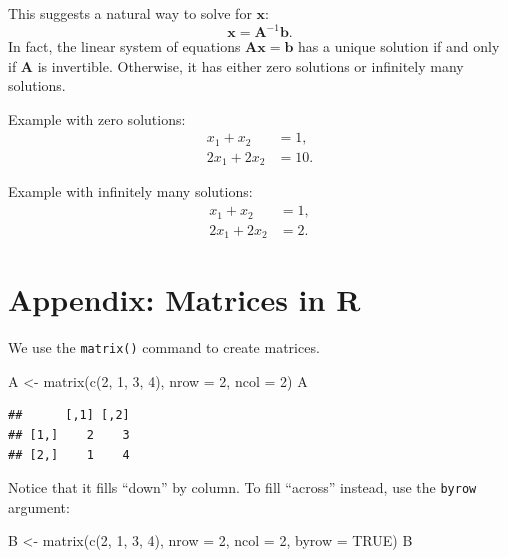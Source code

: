 \documentclass[
  12pt,
  oneside,openany]{book}
\newenvironment{Shaded}{\begin{snugshade}}{\end{snugshade}}
\newcommand{\AttributeTok}[1]{\textcolor[rgb]{0.77,0.63,0.00}{#1}}
\newcommand{\ConstantTok}[1]{\textcolor[rgb]{0.00,0.00,0.00}{#1}}
\newcommand{\DecValTok}[1]{\textcolor[rgb]{0.00,0.00,0.81}{#1}}
\newcommand{\FunctionTok}[1]{\textcolor[rgb]{0.00,0.00,0.00}{#1}}
\newcommand{\NormalTok}[1]{#1}
\newcommand{\OtherTok}[1]{\textcolor[rgb]{0.56,0.35,0.01}{#1}}
\begin{document}
This suggests a natural way to solve for \(\mathbf{x}\): \[\mathbf{x} = \mathbf{A}^{-1} \mathbf{b}.\] In fact, the linear system of equations \(\mathbf{A} \mathbf{x} = \mathbf{b}\) has a unique solution if and only if \(\mathbf{A}\) is invertible. Otherwise, it has either zero solutions or infinitely many solutions.

Example with zero solutions:
\[
\begin{aligned}
x_1 + x_2 &= 1, \\
2 x_1 + 2 x_2 &= 10.
\end{aligned}
\]

Example with infinitely many solutions:
\[
\begin{aligned}
x_1 + x_2 &= 1, \\
2 x_1 + 2 x_2 &= 2.
\end{aligned}
\]

\hypertarget{appendix-matrices-in-r}{%
\section{Appendix: Matrices in R}\label{appendix-matrices-in-r}}

We use the \texttt{matrix()} command to create matrices.

\begin{Shaded}
\begin{Highlighting}[]
\NormalTok{A }\OtherTok{\textless{}{-}} \FunctionTok{matrix}\NormalTok{(}\FunctionTok{c}\NormalTok{(}\DecValTok{2}\NormalTok{, }\DecValTok{1}\NormalTok{, }\DecValTok{3}\NormalTok{, }\DecValTok{4}\NormalTok{),}
            \AttributeTok{nrow =} \DecValTok{2}\NormalTok{,}
            \AttributeTok{ncol =} \DecValTok{2}\NormalTok{)}
\NormalTok{A}
\end{Highlighting}
\end{Shaded}

\begin{verbatim}
##      [,1] [,2]
## [1,]    2    3
## [2,]    1    4
\end{verbatim}

Notice that it fills ``down'' by column. To fill ``across'' instead, use the \texttt{byrow} argument:

\begin{Shaded}
\begin{Highlighting}[]
\NormalTok{B }\OtherTok{\textless{}{-}} \FunctionTok{matrix}\NormalTok{(}\FunctionTok{c}\NormalTok{(}\DecValTok{2}\NormalTok{, }\DecValTok{1}\NormalTok{, }\DecValTok{3}\NormalTok{, }\DecValTok{4}\NormalTok{),}
            \AttributeTok{nrow =} \DecValTok{2}\NormalTok{,}
            \AttributeTok{ncol =} \DecValTok{2}\NormalTok{,}
            \AttributeTok{byrow =} \ConstantTok{TRUE}\NormalTok{)}
\NormalTok{B}
\end{Highlighting}
\end{Shaded}
\end{document}
